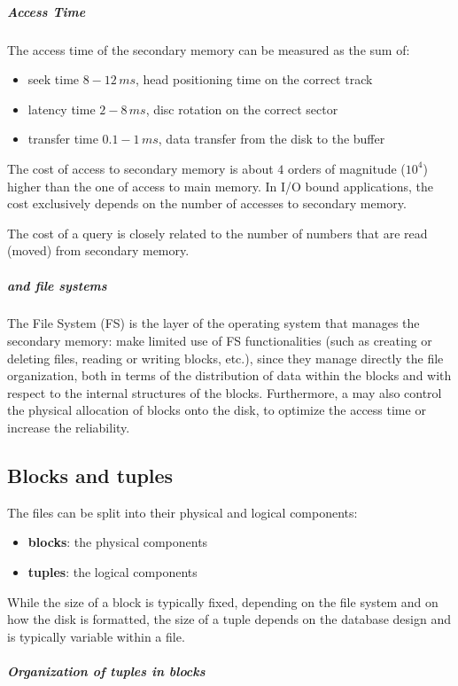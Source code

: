 \documentclass[english]{article}
\begin{document}
\subparagraph*{Access Time}
The access time of the secondary memory can be measured as the sum of:
\begin{itemize}
  \item seek time \(8-12 \, ms\), head positioning time on the correct track
  \item latency time \(2-8 \, ms\), disc rotation on the correct sector
  \item transfer time \(0.1-1 \, ms\), data transfer from the disk to the buffer
\end{itemize}

The cost of access to secondary memory is about \(4\) orders of magnitude (\(10^4\)) higher than the one of access to main memory.
In I/O bound applications, the cost exclusively depends on the number of accesses to secondary memory.

The cost of a query is closely related to the number of numbers that are read (moved) from secondary memory.

\subparagraph*{\dbms and file systems}
The File System (FS) is the layer of the operating system that manages the secondary memory:
\dbms make limited use of FS functionalities (such as creating or deleting files, reading or writing blocks, etc.), since they manage directly the file organization, both in terms of the distribution of data within the blocks and with respect to the internal structures of the blocks.
Furthermore, a \dbms may also control the physical allocation of blocks onto the disk, to optimize the access time or increase the reliability.

\subsection{Blocks and tuples}

The files can be split into their physical and logical components:

\begin{itemize}
  \item \textbf{blocks}: the physical components
  \item \textbf{tuples}: the logical components
\end{itemize}

While the size of a block is typically fixed, depending on the file system and on how the disk is formatted, the size of a tuple depends on the database design and is typically variable within a file.

\subparagraph*{Organization of tuples in blocks}
\end{document}

